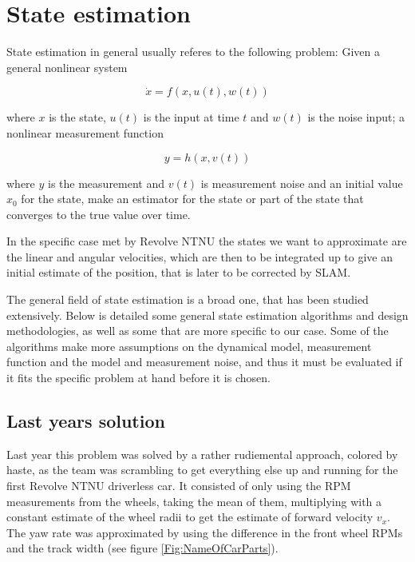 \section{State estimation}

State estimation in general usually referes to the following problem:  Given a general nonlinear system 

\begin{equation}
    \Dot{x} = f(x,u(t), w(t))
\end{equation}

where $x$ is the state, $u(t)$ is the input at time $t$ and $w(t)$ is the noise input; a nonlinear measurement function

\begin{equation}
    y = h(x,v(t))
\end{equation}

where $y$ is the measurement and $v(t)$ is measurement noise and an initial value $x_0$ for the state, make an estimator for the state or part of the state that converges to the true value over time.

In the specific case met by Revolve NTNU the states we want to approximate are the linear and angular velocities, which are then to be integrated up to give an initial estimate of the position, that is later to be corrected by SLAM.

The general field of state estimation is a broad one, that has been studied extensively. Below is detailed some general state estimation algorithms and design methodologies, as well as some that are more specific to our case. Some of the algorithms make more assumptions on the dynamical model, measurement function and the model and measurement noise, and thus it must be evaluated if it fits the specific problem at hand before it is chosen. 

\subsection{Last years solution}

Last year this problem was solved by a rather rudiemental approach, colored by haste, as the team was scrambling to get everything else up and running for the first Revolve NTNU driverless car. It consisted of only using the RPM measurements from the wheels, taking the mean of them, multiplying with a constant estimate of the wheel radii to get the estimate of forward velocity $v_x$. The yaw rate was approximated by using the difference in the front wheel RPMs and the track width (see figure \ref{Fig:NameOfCarParts}).  

